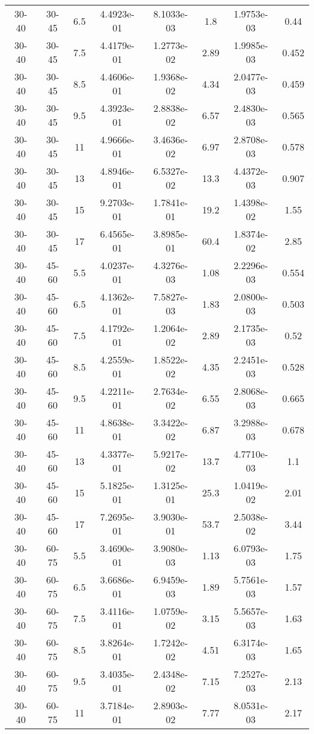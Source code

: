 \begin{longtable}{|cccccccc|}
30-40 & 30-45 & 6.5 & 4.4923e-01 & 8.1033e-03 & 1.8 & 1.9753e-03 & 0.44 \\ 
30-40 & 30-45 & 7.5 & 4.4179e-01 & 1.2773e-02 & 2.89 & 1.9985e-03 & 0.452 \\ 
30-40 & 30-45 & 8.5 & 4.4606e-01 & 1.9368e-02 & 4.34 & 2.0477e-03 & 0.459 \\ 
30-40 & 30-45 & 9.5 & 4.3923e-01 & 2.8838e-02 & 6.57 & 2.4830e-03 & 0.565 \\ 
30-40 & 30-45 & 11 & 4.9666e-01 & 3.4636e-02 & 6.97 & 2.8708e-03 & 0.578 \\ 
30-40 & 30-45 & 13 & 4.8946e-01 & 6.5327e-02 & 13.3 & 4.4372e-03 & 0.907 \\ 
30-40 & 30-45 & 15 & 9.2703e-01 & 1.7841e-01 & 19.2 & 1.4398e-02 & 1.55 \\ 
30-40 & 30-45 & 17 & 6.4565e-01 & 3.8985e-01 & 60.4 & 1.8374e-02 & 2.85 \\ 
\hline
30-40 & 45-60 & 5.5 & 4.0237e-01 & 4.3276e-03 & 1.08 & 2.2296e-03 & 0.554 \\ 
30-40 & 45-60 & 6.5 & 4.1362e-01 & 7.5827e-03 & 1.83 & 2.0800e-03 & 0.503 \\ 
30-40 & 45-60 & 7.5 & 4.1792e-01 & 1.2064e-02 & 2.89 & 2.1735e-03 & 0.52 \\ 
30-40 & 45-60 & 8.5 & 4.2559e-01 & 1.8522e-02 & 4.35 & 2.2451e-03 & 0.528 \\ 
30-40 & 45-60 & 9.5 & 4.2211e-01 & 2.7634e-02 & 6.55 & 2.8068e-03 & 0.665 \\ 
30-40 & 45-60 & 11 & 4.8638e-01 & 3.3422e-02 & 6.87 & 3.2988e-03 & 0.678 \\ 
30-40 & 45-60 & 13 & 4.3377e-01 & 5.9217e-02 & 13.7 & 4.7710e-03 & 1.1 \\ 
30-40 & 45-60 & 15 & 5.1825e-01 & 1.3125e-01 & 25.3 & 1.0419e-02 & 2.01 \\ 
30-40 & 45-60 & 17 & 7.2695e-01 & 3.9030e-01 & 53.7 & 2.5038e-02 & 3.44 \\ 
\hline
30-40 & 60-75 & 5.5 & 3.4690e-01 & 3.9080e-03 & 1.13 & 6.0793e-03 & 1.75 \\ 
30-40 & 60-75 & 6.5 & 3.6686e-01 & 6.9459e-03 & 1.89 & 5.7561e-03 & 1.57 \\ 
30-40 & 60-75 & 7.5 & 3.4116e-01 & 1.0759e-02 & 3.15 & 5.5657e-03 & 1.63 \\ 
30-40 & 60-75 & 8.5 & 3.8264e-01 & 1.7242e-02 & 4.51 & 6.3174e-03 & 1.65 \\ 
30-40 & 60-75 & 9.5 & 3.4035e-01 & 2.4348e-02 & 7.15 & 7.2527e-03 & 2.13 \\ 
30-40 & 60-75 & 11 & 3.7184e-01 & 2.8903e-02 & 7.77 & 8.0531e-03 & 2.17 \\ 

\end{longtable}
